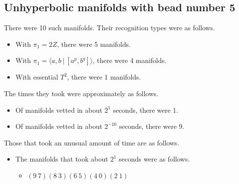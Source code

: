 \documentclass{article}
\begin{document}
\subsection{Unhyperbolic manifolds with bead number 5}
There were 10 such manifolds.
Their recognition types were as follows.
\begin{itemize}
\item With $\pi_1 =2 Z$, there were 5 manifolds.
\item With $\pi_1 = \langle a,b\ |\ [a^p,b^q]\rangle$, there were 4 manifolds.
\item With essential $T^2$, there were 1 manifolds.
\end{itemize}
The times they took were approximately as follows.
\begin{itemize}
\item Of manifolds vetted in about $2^{1}$ seconds, there were 1.
\item Of manifolds vetted in about $2^{-10}$ seconds, there were 9.
\end{itemize}
Those that took an unusual amount of time are as follows.
\begin{itemize}
\item The manifolds that took about $2^{1}$ seconds were as follows.
\begin{itemize}
\item $(9\ 7)(8\ 3)(6\ 5)(4\ 0)(2\ 1)$
\end{itemize}
\end{itemize}
\end{document}
